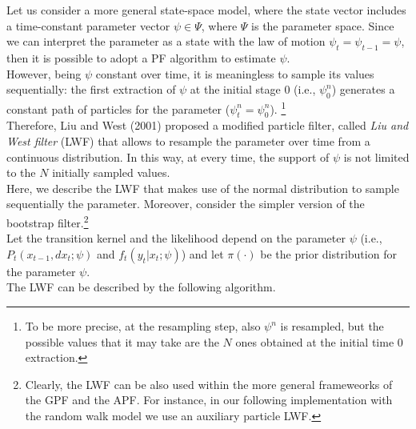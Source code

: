 \documentclass[
]{book}
\theoremstyle{break}
\theoremstyle{nonumberplain}
\begin{document}
Let us consider a more general state-space model, where the state vector
includes a time-constant parameter vector \(\psi \in \Psi\), where
\(\Psi\) is the parameter space. Since we can interpret the parameter as
a state with the law of motion \(\psi_t=\psi_{t-1}=\psi\), then it is
possible to adopt a PF algorithm to estimate \(\psi\).\\
However, being \(\psi\) constant over time, it is meaningless to sample
its values sequentially: the first extraction of \(\psi\) at the initial
stage 0 (i.e., \(\psi_0^n\)) generates a constant path of particles for
the parameter (\(\psi_t^n=\psi_0^n\)).
\footnote{To be more precise, at the resampling step, also $\psi^n$ is resampled, but the possible values that it may take are the $N$ ones obtained at the initial time 0 extraction.}\\
Therefore, Liu and West (2001) proposed a modified particle filter,
called \textit{Liu and West filter} (LWF) that allows to resample the
parameter over time from a continuous distribution. In this way, at
every time, the support of \(\psi\) is not limited to the \(N\)
initially sampled values.\\
Here, we describe the LWF that makes use of the normal distribution to
sample sequentially the parameter. Moreover, consider the simpler
version of the bootstrap
filter.\footnote{Clearly, the LWF can be also used within the more general frameweorks of the GPF and the APF. For instance, in our following implementation with the random walk model we use an auxiliary particle LWF.}\\
Let the transition kernel and the likelihood depend on the parameter
\(\psi\) (i.e., \(P_t(x_{t-1},dx_t;\psi)\) and \(f_t(y_t|x_t;\psi)\))
and let \(\pi(\cdot)\) be the prior distribution for the parameter
\(\psi\).\\
The LWF can be described by the following algorithm.
\end{document}
